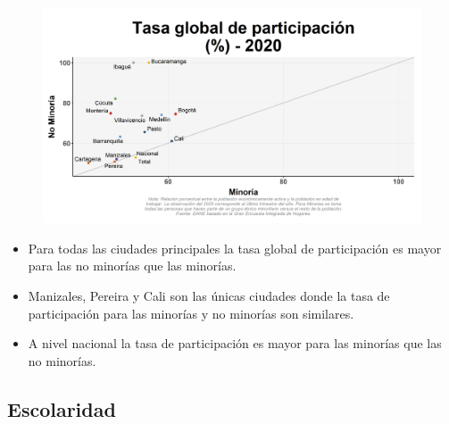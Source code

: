     \begin{figure}[H]
        \caption[Tasa global de participación por ciudades por minorías y no minorías ]{\label{partic_minoria_ciudad_scatter} }
        \begin{center}
        \includegraphics[width=\textwidth,keepaspectratio]{img/var_77_scatter.png}
        \end{center}
    \end{figure}
            \begin{itemize}
                \item Para todas las ciudades principales la tasa global de participación es mayor para las no minorías que las minorías.
                \item Manizales, Pereira y Cali son las únicas ciudades donde la tasa de participación para las minorías y no minorías son similares.
                \item A nivel nacional la tasa de participación es mayor para las minorías que las no minorías.
                \end{itemize}

    \subsection{Escolaridad}

